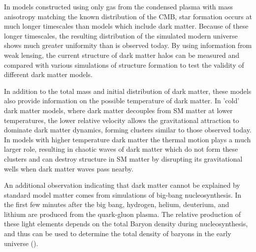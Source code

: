 In models constructed using only gas from the condensed plasma with mass anisotropy matching the known distribution of the CMB, star formation occurs at much longer timescales than models which include dark matter.
Because of these longer timescales, the resulting distribution of the simulated modern universe shows much greater uniformity than is observed today. 
By using information from weak lensing, the current structure of dark matter halos can be measured and compared with various simulations of structure formation to test the validity of different dark matter models.

In addition to the total mass and initial distribution of dark matter, these models also provide information on the possible temperature of dark matter.
In 'cold' dark matter models, where dark matter decouples from SM matter at lower temperatures, the lower relative velocity allows the gravitational attraction to dominate dark matter dynamics, forming clusters similar to those observed today.
In models with higher temperature dark matter the thermal motion plays a much larger role, resulting in chaotic waves of dark matter which do not form these clusters and can destroy structure in SM matter by disrupting its gravitational wells when dark matter waves pass nearby.

An additional observation indicating that dark matter cannot be explained by standard model matter comes from simulations of big-bang nucleosynthesis. 
In the first few minutes after the big bang, hydrogen, helium, deuterium, and lithium are produced from the quark-gluon plasma. 
The relative production of these light elements depends on the total Baryon density during nucleosynthesis, and thus can be used to determine the total density of baryons in the early universe ().

